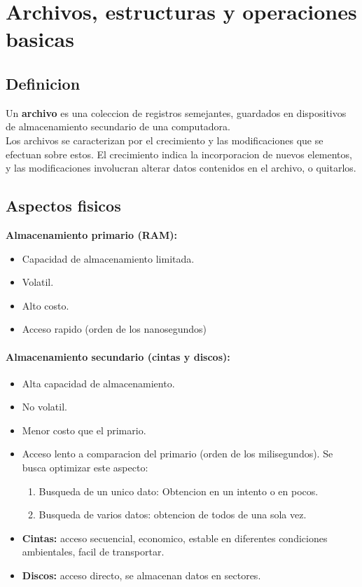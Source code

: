 \section{Archivos, estructuras y operaciones basicas}
\subsection{Definicion}
Un \textbf{archivo} es una coleccion de registros semejantes, guardados en dispositivos de almacenamiento secundario de una computadora. \\
Los archivos se caracterizan por el crecimiento y las modificaciones que se efectuan sobre estos. El crecimiento indica la incorporacion de nuevos elementos, y las modificaciones involucran alterar datos contenidos en el archivo, o quitarlos.

\subsection{Aspectos fisicos}
 \textbf{Almacenamiento primario (RAM): }
\begin{itemize}
    \item Capacidad de almacenamiento limitada.
    \item Volatil.
    \item Alto costo.
    \item Acceso rapido (orden de los nanosegundos)
\end{itemize}

\paragraph{Almacenamiento secundario (cintas y discos):}
\begin{itemize}
    \item Alta capacidad de almacenamiento.
    \item No volatil.
    \item Menor costo que el primario.
    \item Acceso lento a comparacion del primario (orden de los milisegundos). Se busca optimizar este aspecto:
    \begin{enumerate}
        \item Busqueda de un unico dato: Obtencion en un intento o en pocos.
        \item Busqueda de varios datos: obtencion de todos de una sola vez.
    \end{enumerate}
    \item \textbf{Cintas: }acceso secuencial, economico, estable en diferentes condiciones ambientales, facil de transportar.
    \item \textbf{Discos: }acceso directo, se almacenan datos en sectores.
\end{itemize}


